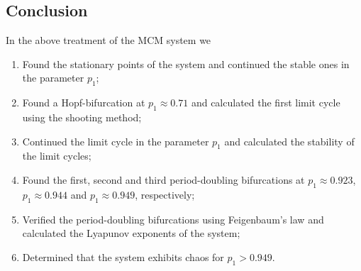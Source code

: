 \subsection{Conclusion}
In the above treatment of the MCM system we 
\begin{enumerate}
    \item Found the stationary points of the system and continued the stable ones in the parameter $p_1$;
    \item Found a Hopf-bifurcation at $p_1 \approx 0.71$ and calculated the first limit cycle using the shooting method;
    \item Continued the limit cycle in the parameter $p_1$ and calculated the stability of the limit cycles;
    \item Found the first, second and third period-doubling bifurcations at $p_1 \approx 0.923$, $p_1 \approx 0.944$ and $p_1 \approx 0.949$, respectively;
    \item Verified the period-doubling bifurcations using Feigenbaum's law and calculated the Lyapunov exponents of the system;
    \item Determined that the system exhibits chaos for $p_1 > 0.949$.
\end{enumerate}
